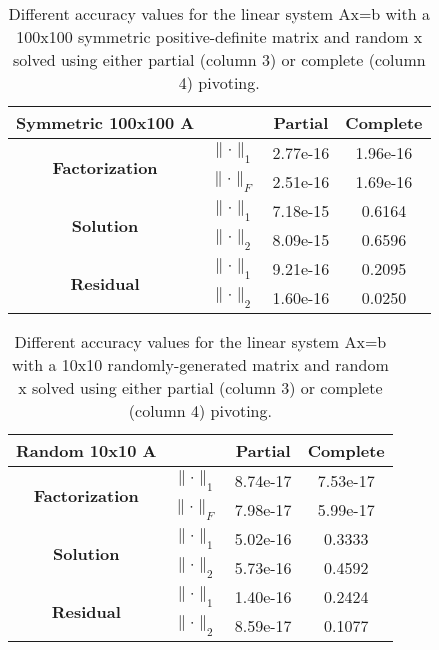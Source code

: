 \documentclass[11pt]{article}
\newcommand{\norm}[1]{\lVert#1\rVert}
\begin{document}
\begin{table}[h]
	\centering
	\begin{tabular}{|c|c|c|c|}
	\hline
	\textbf{Symmetric 100x100 A}           &         	    & \textbf{Partial} & \textbf{Complete} \\ \hline
	\multirow{2}{*}{\textbf{Factorization}} 	& $\norm{\cdot}_1$ & 2.77e-16         & 1.96e-16          \\ \cline{2-4} 
				                                           & $\norm{\cdot}_F$ & 2.51e-16         & 1.69e-16          \\ \hline
	\multirow{2}{*}{\textbf{Solution}}      		& $\norm{\cdot}_1$ & 7.18e-15         & 0.6164            \\ \cline{2-4} 
				                                           & $\norm{\cdot}_2$ & 8.09e-15         & 0.6596            \\ \hline
	\multirow{2}{*}{\textbf{Residual}}      		& $\norm{\cdot}_1$ & 9.21e-16         & 0.2095            \\ \cline{2-4} 
	                                  			           & $\norm{\cdot}_2$ & 1.60e-16         & 0.0250            \\ \hline
	\end{tabular}
	\caption{Different accuracy values for the linear system Ax=b with a 100x100 symmetric positive-definite matrix and random x solved using either partial (column 3) or complete (column 4) pivoting.}
	\label{tab:sym100}
\end{table}

\begin{table}[h]
	\centering
	\begin{tabular}{|c|c|c|c|}
	\hline
	\textbf{Random 10x10 A}                 &                  			& \textbf{Partial} & \textbf{Complete} \\ \hline
	\multirow{2}{*}{\textbf{Factorization}} 		& $\norm{\cdot}_1$ & 8.74e-17         & 7.53e-17          \\ \cline{2-4} 
				    	                                           & $\norm{\cdot}_F$ & 7.98e-17         & 5.99e-17          \\ \hline
	\multirow{2}{*}{\textbf{Solution}}      			& $\norm{\cdot}_1$ & 5.02e-16         & 0.3333            \\ \cline{2-4} 
	                                        					& $\norm{\cdot}_2$ & 5.73e-16         & 0.4592            \\ \hline
	\multirow{2}{*}{\textbf{Residual}}      			& $\norm{\cdot}_1$ & 1.40e-16         & 0.2424            \\ \cline{2-4} 
	                                        					& $\norm{\cdot}_2$ & 8.59e-17         & 0.1077            \\ \hline
	\end{tabular}
	\caption{Different accuracy values for the linear system Ax=b with a 10x10 randomly-generated matrix and random x solved using either partial (column 3) or complete (column 4) pivoting.}
	\label{tab:rand10}
\end{table}
\end{document}
